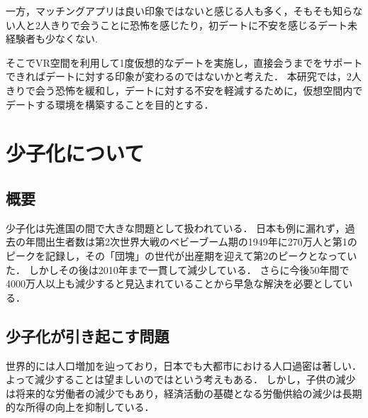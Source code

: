 \documentclass[12pt,a4j,titlepage]{ltjsarticle}
\begin{document}
一方，マッチングアプリは良い印象ではないと感じる人も多く，そもそも知らない人と2人きりで会うことに恐怖を感じたり，初デートに不安を感じるデート未経験者も少なくない\cite{prtimes,yoshimura2020}.


そこでVR空間を利用して1度仮想的なデートを実施し，直接会うまでをサポートできればデートに対する印象が変わるのではないかと考えた．
本研究では，2人きりで会う恐怖を緩和し，デートに対する不安を軽減するために，仮想空間内でデートする環境を構築することを目的とする．
\clearpage

\section{少子化について}\label{少子化について}
\subsection{概要}
少子化は先進国の間で大きな問題として扱われている．
日本も例に漏れず，過去の年間出生者数は第2次世界大戦のベビーブーム期の1949年に270万人と第1のピークを記録し，その「団塊」の世代が出産期を迎えて第2のピークとなっていた．
しかしその後は2010年まで一貫して減少している．
さらに今後50年間で4000万人以上も減少すると見込まれていることから早急な解決を必要としている．
\subsection{少子化が引き起こす問題}
世界的には人口増加を辿っており，日本でも大都市における人口過密は著しい．よって減少することは望ましいのではという考えもある．
しかし，子供の減少は将来的な労働者の減少でもあり，経済活動の基礎となる労働供給の減少は長期的な所得の向上を抑制している．
\end{document}
